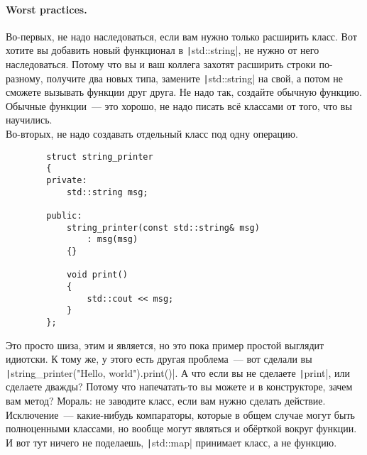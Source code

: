 \documentclass{article}
\begin{document}
    \paragraph{Worst practices.}
    Во-первых, не надо наследоваться, если вам нужно только расширить класс. Вот хотите вы добавить новый функционал в \texttt|std::string|, не нужно от него наследоваться. Потому что вы и ваш коллега захотят расширить строки по-разному, получите два новых типа, замените \texttt|std::string| на свой, а потом не сможете вызывать функции друг друга. Не надо так, создайте обычную функцию. Обычные функции~--- это хорошо, не надо писать всё классами от того, что вы научились.\\
    Во-вторых, не надо создавать отдельный класс под одну операцию.
    \begin{verbatim}
        struct string_printer
        {
        private:
            std::string msg;

        public:
            string_printer(const std::string& msg)
                : msg(msg)
            {}

            void print()
            {
                std::cout << msg;
            }
        };
    \end{verbatim}
    Это просто шиза, этим и является, но это пока пример простой выглядит идиотски. К тому же, у этого есть другая проблема~--- вот сделали вы \texttt|string_printer("Hello, world").print()|. А что если вы не сделаете \texttt|print|, или сделаете дважды? Потому что напечатать-то вы можете и в конструкторе, зачем вам метод? Мораль: не заводите класс, если вам нужно сделать действие. Исключение~--- какие-нибудь компараторы, которые в общем случае могут быть полноценными классами, но вообще могут являться и обёрткой вокруг функции. И вот тут ничего не поделаешь, \texttt|std::map| принимает класс, а не функцию.
\end{document}
